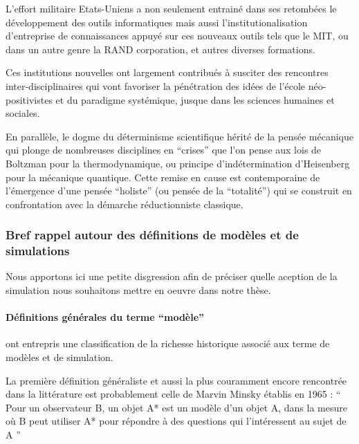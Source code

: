 L'effort militaire Etats-Uniens a non seulement entrainé dans ses retombées le développement des outils informatiques mais aussi l'institutionalisation d'entreprise de connaissances appuyé sur ces nouveaux outils tels que le MIT, ou dans un autre genre la RAND corporation, et autres diverses formations.

Ces institutions nouvelles ont largement contribués à susciter des rencontres inter-disciplinaires qui vont favoriser la pénétration des idées de l'école néo-positivistes et du paradigme systémique, jusque dans les sciences humaines et sociales.

En parallèle, le dogme du déterminisme scientifique hérité de la pensée mécanique qui plonge de nombreuses disciplines en \enquote{crises} \autocite[20-23]{Pouvreau2013} que l'on pense aux lois de Boltzman pour la thermodynamique, ou principe d’indétermination d'Heisenberg pour la mécanique quantique. Cette remise en cause est contemporaine de l'émergence d'une pensée \enquote{holiste} (ou pensée de la \enquote{totalité}) qui se construit en confrontation avec la démarche réductionniste classique.


\subsubsection{Bref rappel autour des définitions de modèles et de simulations}

Nous apportons ici une petite disgression afin de préciser quelle aception de la simulation nous souhaitons mettre en oeuvre dans notre thèse.

\paragraph{Définitions générales du terme \enquote{modèle}}

\textcite{Varenne2013} ont entrepris une classification de la richesse historique associé aux terme de modèles et de simulation.

La première définition généraliste et aussi la plus couramment encore rencontrée dans la littérature est probablement celle de Marvin Minsky établis en 1965 \autocite{Varenne2008} \autocite[15]{Varenne2013}  : \enquote{ Pour un observateur B, un objet A* est un modèle d’un objet A, dans la mesure où B peut utiliser A* pour répondre à des questions qui l’intéressent au sujet de A } \autocite{Minsky1965}

